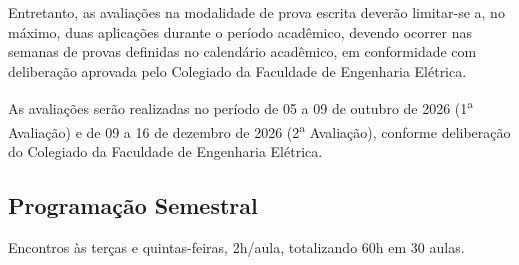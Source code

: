 \documentclass[oneside,a4paper,12pt]{article}
\begin{document}
Entretanto, as avaliações na modalidade de prova escrita deverão limitar-se a, no máximo, duas aplicações durante o período acadêmico, devendo ocorrer nas semanas de provas definidas no calendário acadêmico, em conformidade com deliberação aprovada pelo Colegiado da Faculdade de Engenharia Elétrica.

As avaliações serão realizadas no período de 05 a 09 de outubro de 2026 (1\textsuperscript{a} Avaliação) e de 09 a 16 de dezembro de 2026 (2\textsuperscript{a} Avaliação), conforme deliberação do Colegiado da Faculdade de Engenharia Elétrica.%

\newpage
  \begin{snugshade}
  \section*{Programação Semestral} %
  \end{snugshade}

Encontros às terças e quintas-feiras, 2h/aula, totalizando 60h em 30 aulas.
\end{document}
